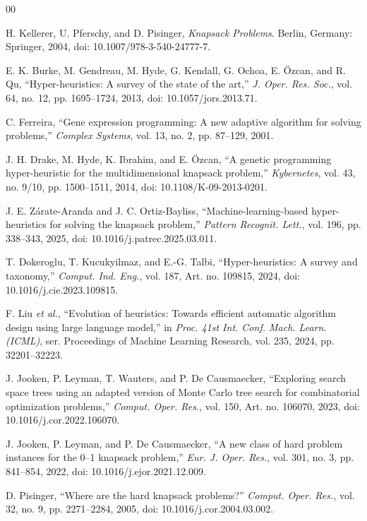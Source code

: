 \documentclass[conference]{IEEEtran}
\begin{document}
\begin{thebibliography}{00}

H. Kellerer, U. Pferschy, and D. Pisinger, \emph{Knapsack Problems}.
Berlin, Germany: Springer, 2004, doi: 10.1007/978-3-540-24777-7.

E. K. Burke, M. Gendreau, M. Hyde, G. Kendall, G. Ochoa, E. \"Ozcan,
and R. Qu, ``Hyper-heuristics: A survey of the state of the art,''
\emph{J. Oper. Res. Soc.}, vol. 64, no. 12, pp. 1695--1724, 2013,
doi: 10.1057/jors.2013.71.

C. Ferreira, ``Gene expression programming: A new adaptive algorithm for
solving problems,'' \emph{Complex Systems}, vol. 13, no. 2, pp. 87--129,
2001.

J. H. Drake, M. Hyde, K. Ibrahim, and E. \"Ozcan, ``A genetic programming
hyper-heuristic for the multidimensional knapsack problem,'' \emph{Kybernetes},
vol. 43, no. 9/10, pp. 1500--1511, 2014,
doi: 10.1108/K-09-2013-0201.

J. E. Z\'arate-Aranda and J. C. Ortiz-Bayliss,
``Machine-learning-based hyper-heuristics for solving the knapsack problem,''
\emph{Pattern Recognit. Lett.}, vol. 196, pp. 338--343, 2025,
doi: 10.1016/j.patrec.2025.03.011.

T. Dokeroglu, T. Kucukyilmaz, and E.-G. Talbi,
``Hyper-heuristics: A survey and taxonomy,''
\emph{Comput. Ind. Eng.}, vol. 187, Art. no. 109815, 2024,
doi: 10.1016/j.cie.2023.109815.

F. Liu \emph{et al.},
``Evolution of heuristics: Towards efficient automatic algorithm
design using large language model,''
in \emph{Proc. 41st Int. Conf. Mach. Learn. (ICML)},
ser. Proceedings of Machine Learning Research, vol. 235,
2024, pp. 32201--32223.

J. Jooken, P. Leyman, T. Wauters, and P. De Causmaecker,
``Exploring search space trees using an adapted version of Monte Carlo
tree search for combinatorial optimization problems,''
\emph{Comput. Oper. Res.}, vol. 150, Art. no. 106070, 2023,
doi: 10.1016/j.cor.2022.106070.

J. Jooken, P. Leyman, and P. De Causmaecker, ``A new class of hard problem
instances for the 0--1 knapsack problem,'' \emph{Eur. J. Oper. Res.},
vol. 301, no. 3, pp. 841--854, 2022,
doi: 10.1016/j.ejor.2021.12.009.

D. Pisinger, ``Where are the hard knapsack problems?''
\emph{Comput. Oper. Res.}, vol. 32, no. 9, pp. 2271--2284, 2005,
doi: 10.1016/j.cor.2004.03.002.


\end{thebibliography}
\end{document}
